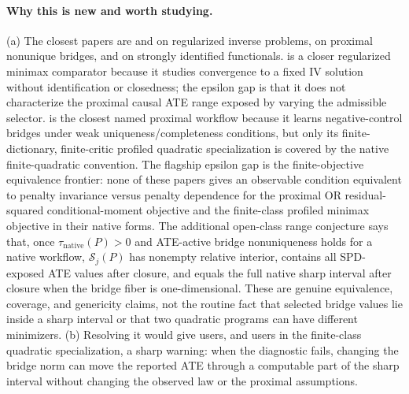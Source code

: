 \documentclass[11pt]{article}
\theoremstyle{definition}
\theoremstyle{plain}
\theoremstyle{remark}
\begin{document}
\paragraph{Why this is new and worth studying.}
(a) The closest papers are \citet{DarollesFanFlorensRenault2011Econometrica}
and \citet{Horowitz2014ARE} on regularized inverse problems,
\citet{ZhangLiMiaoTchetgen2023SPL} on proximal nonunique bridges, and
\citet{BennettKallusMaoNeweySyrgkanisUehara2023COLT} on strongly identified
functionals.  \citet{BennettKallusMaoNeweySyrgkanisUehara2023MinimaxIV}
is a closer regularized minimax comparator because it studies convergence to a
fixed IV solution without identification or closedness; the epsilon gap is
that it does not characterize the proximal causal ATE range exposed by varying
the admissible selector.  \citet{KallusMaoUehara2021MinimaxNC} is the closest named
proximal workflow because it learns negative-control bridges under weak
uniqueness/completeness conditions, but only its finite-dictionary,
finite-critic profiled quadratic specialization is covered by the native
finite-quadratic convention.  The flagship epsilon gap is the finite-objective
equivalence frontier: none of these papers gives an observable condition
equivalent to penalty invariance versus penalty dependence for the proximal OR
residual-squared conditional-moment objective and the finite-class profiled
minimax objective in their native forms.  The
additional open-class range conjecture says that, once
\(\tau_{\mathrm{native}}(P)>0\) and ATE-active bridge nonuniqueness holds for
a native workflow, \(\mathcal S_j(P)\) has nonempty relative interior,
contains all SPD-exposed ATE values after closure, and equals the full native
sharp interval after closure when the bridge fiber is one-dimensional.  These
are genuine equivalence, coverage, and genericity claims, not the routine
fact that selected bridge values lie inside a sharp interval or that two
quadratic programs can have different minimizers.  (b) Resolving it would give
\citet{CuiPuShiMiaoTchetgen2024JASA} users, and
\citet{KallusMaoUehara2021MinimaxNC} users in the finite-class quadratic
specialization, a sharp warning: when the diagnostic fails, changing the
bridge norm can move the reported ATE through a computable part of the sharp
interval without changing the observed law or the proximal assumptions.
\end{document}
